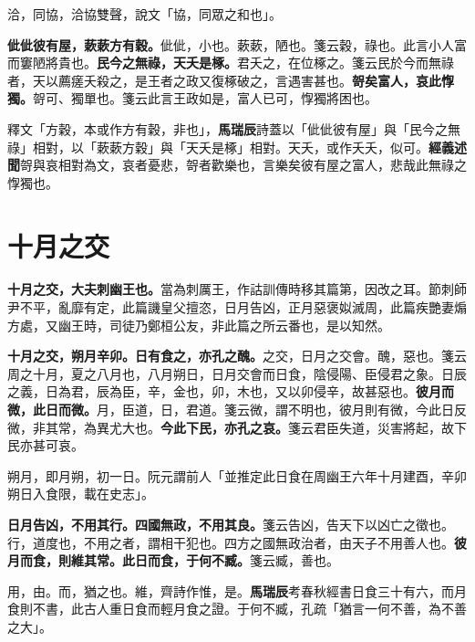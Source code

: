 \begin{quoting}洽，同協，洽協雙聲，說文「協，同眾之和也」。\end{quoting}

\textbf{佌佌彼有屋，蔌蔌方有穀。}{\footnotesize 佌佌，小也。蔌蔌，陋也。箋云穀，祿也。此言小人富而窶陋將貴也。}\textbf{民今之無祿，天夭是椓。}{\footnotesize 君夭之，在位椓之。箋云民於今而無祿者，天以薦瘥夭殺之，是王者之政又復椓破之，言遇害甚也。}\textbf{哿矣富人，哀此惸獨。}{\footnotesize 哿可、獨單也。箋云此言王政如是，富人已可，惸獨將困也。}

\begin{quoting}釋文「方穀，本或作方有穀，非也」，\textbf{馬瑞辰}詩蓋以「佌佌彼有屋」與「民今之無祿」相對，以「蔌蔌方穀」與「天夭是椓」相對。天夭，或作夭夭，似可。\textbf{經義述聞}哿與哀相對為文，哀者憂悲，哿者歡樂也，言樂矣彼有屋之富人，悲哉此無祿之惸獨也。\end{quoting}

\section{十月之交}


\textbf{十月之交，大夫刺幽王也。}{\footnotesize 當為刺厲王，作詁訓傳時移其篇第，因改之耳。節刺師尹不平，亂靡有定，此篇譏皇父擅恣，日月告凶，正月惡褒姒滅周，此篇疾艷妻煽方處，又幽王時，司徒乃鄭桓公友，非此篇之所云番也，是以知然。}

\textbf{十月之交，朔月辛卯。日有食之，亦孔之醜。}{\footnotesize 之交，日月之交會。醜，惡也。箋云周之十月，夏之八月也，八月朔日，日月交會而日食，陰侵陽、臣侵君之象。日辰之義，日為君，辰為臣，辛，金也，卯，木也，又以卯侵辛，故甚惡也。}\textbf{彼月而微，此日而微。}{\footnotesize 月，臣道，日，君道。箋云微，謂不明也，彼月則有微，今此日反微，非其常，為異尤大也。}\textbf{今此下民，亦孔之哀。}{\footnotesize 箋云君臣失道，災害將起，故下民亦甚可哀。}

\begin{quoting}朔月，即月朔，初一日。阮元謂前人「並推定此日食在周幽王六年十月建酉，辛卯朔日入食限，載在史志」。\end{quoting}

\textbf{日月告凶，不用其行。四國無政，不用其良。}{\footnotesize 箋云告凶，告天下以凶亡之徵也。行，道度也，不用之者，謂相干犯也。四方之國無政治者，由天子不用善人也。}\textbf{彼月而食，則維其常。此日而食，于何不臧。}{\footnotesize 箋云臧，善也。}

\begin{quoting}用，由。而，猶之也。維，齊詩作惟，是。\textbf{馬瑞辰}考春秋經書日食三十有六，而月食則不書，此古人重日食而輕月食之證。于何不臧，孔疏「猶言一何不善，為不善之大」。\end{quoting}

